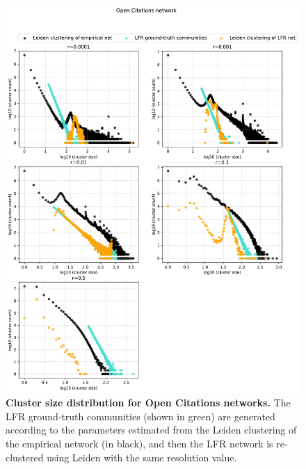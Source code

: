 \documentclass[a4paper]{article}   	%
\begin{document}
\begin{figure}[H]
\centering
\includegraphics[width=0.85\linewidth]{figs/oc_cm_size.pdf}
\caption[Cluster size distribution for Open Citations networks.]{\textbf{Cluster size distribution for Open Citations networks.} The LFR ground-truth communities (shown in green) are generated according to the parameters estimated from the Leiden clustering of the empirical network (in black), and then the LFR network is re-clustered using Leiden with the same resolution value. }
\label{fig:oc_cm_size}
\end{figure}
\end{document}
